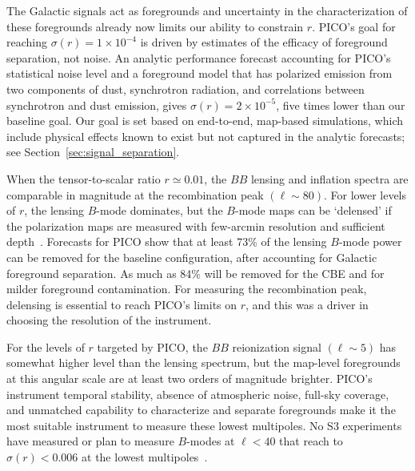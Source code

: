 \documentclass[PICOReport.tex]{subfiles}
\begin{document}
The Galactic signals act as foregrounds and uncertainty in the characterization of these foregrounds already now limits our ability to constrain $r$. PICO's goal for reaching $\sigma(r) = 1\times10^{-4}$ is driven by estimates of the efficacy of foreground separation, not noise.  An analytic performance forecast accounting for PICO's statistical noise level and a foreground model that has polarized emission from two components of dust, synchrotron radiation, and correlations between synchrotron and dust emission, gives $\sigma(r) = 2\times10^{-5}$, five times lower than our baseline goal. Our goal is set based on end-to-end, map-based simulations, which include physical effects known to exist but not captured in the analytic forecasts; see Section~\ref{sec:signal_separation}.   

When the tensor-to-scalar ratio $r \simeq 0.01$, the $BB$ lensing and inflation spectra are comparable in magnitude at the recombination peak $(\ell \sim 80)$. For lower levels of $r$, the lensing $B$-mode dominates, but the $B$-mode maps can be `delensed' if the polarization maps are measured with few-arcmin resolution and sufficient depth~\citep{2004PhRvD..69d3005S,2012JCAP...06..014S}. Forecasts for PICO show that at least 73\% of the lensing $B$-mode power can be removed for the baseline configuration, after accounting for Galactic foreground separation. As much as 84\% will be removed for the CBE and for milder foreground contamination. For measuring the recombination peak, delensing is essential to reach PICO's limits on $r$, and this was a driver in choosing the resolution of the instrument. 

For the levels of $r$ targeted by PICO, the $BB$ reionization signal $(\ell \sim 5)$ has somewhat higher level than the lensing spectrum, but the map-level foregrounds at this angular scale are at least two orders of magnitude brighter.  PICO's instrument temporal stability, absence of atmospheric noise, full-sky coverage, and unmatched capability to characterize and separate foregrounds make it the most suitable instrument to measure these lowest multipoles. No S3 experiments have measured or plan to measure $B$-modes at $\ell<40$ that reach to $\sigma(r) < 0.006$ at the lowest multipoles~\citep{class}. 
\end{document}
